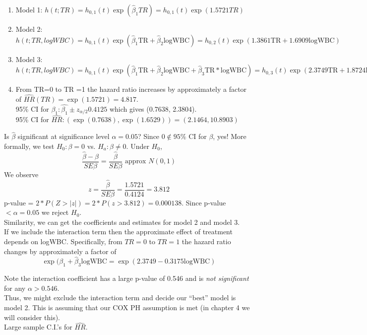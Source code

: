 \documentclass{article}
\begin{document}
\begin{enumerate}
\item Model 1: $h(t;TR) = h_{0,1}(t)\exp(\hat{\beta}_1 TR) = h_{0,1}(t)\exp(1.5721 TR)$
\item Model 2: $h(t;TR,logWBC) = h_{0,1}(t)\exp(\hat{\beta}_1 \text{TR} + \hat{\beta}_2 \text{logWBC} ) = h_{0,2}(t)\exp( 1.3861 \text{TR} + 1.6909 \text{logWBC})$
\item Model 3: $h(t;TR,logWBC) = h_{0,1}(t)\exp(\hat{\beta}_1 \text{TR} + \hat{\beta}_2 \text{logWBC} + \hat{\beta}_3 \text{TR}*\text{logWBC}) = h_{0,3}(t)\exp( 2.3749 \text{TR} + 1.8724 \text{logWBC} - 0.3175 \text{TR}*\text{logWBC})$
\item From TR=0 to TR =1 the hazard ratio increases by approximately a factor of $\hat{HR}(TR)=\exp(1.5721) = 4.817.$ \\
    95\% CI for $\beta_1: \hat{\beta_1} \pm z_{\alpha/2} 0.4125$ which gives (0.7638, 2.3804). \\
    95\% CI for $\hat{HR}: (\exp(0.7638),\exp(1.6529)) = (2.1464, 10.8903)$ \\
\end{enumerate}
Is $\hat{\beta}$ significant at significance level $\alpha=0.05$? Since $0 \notin 95\%$ CI for $\beta$, yes!
More formally, we test $H_0: \beta=0$ vs. $H_a: \beta \neq 0$. Under $H_0$,
\[ \frac{\hat{\beta} -\beta}{SE{\beta}} =  \frac{\hat{\beta}}{SE{\beta}}  \text{ approx } N(0,1)
\]
We observe
\[
z = \frac{\hat{\beta}}{SE{\beta}} = \frac{1.5721}{0.4124} = 3.812
\]
p-value = $2*P(Z>|z|) = 2*P(z>3.812) = 0.000138$. Since p-value $< \alpha=0.05$ we reject $H_0$. \\
Similarity, we can get the coefficients and estimates for model 2 and model 3. \\
If we include the interaction term then the approximate effect of treatment depends on logWBC. Specifically, from $TR=0$ to $TR=1$ the hazard ratio changes by approximately a factor of
\[\exp(\hat{\beta_1}+ \hat{\beta}_3 \text{logWBC} = \exp(2.3749 - 0.3175\text{logWBC}) \]

Note the interaction coefficient has a large p-value of 0.546 and is \textit{not significant } for any $\alpha > 0.546$. \\
Thus, we might exclude the interaction term and decide our ``best'' model is model 2. This is assuming that our COX PH assumption is met (in chapter 4 we will consider this). \\

Large sample C.I.'s for $\hat{HR}$. \\
\end{document}
